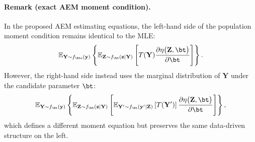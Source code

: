 \paragraph{Remark (exact AEM moment condition).}
In the proposed AEM estimating equations, the left-hand side of the population moment condition remains identical to the MLE:
\[
\mathbb{E}_{\mathbf{Y} \sim f_{\bto}(\mathbf{y})}
\left\{
\mathbb{E}_{\mathbf{Z} \sim f_\bt(\mathbf{z} \mid \mathbf{Y})}
\left[
    T(\mathbf{Y})
    \frac{\partial \eta\bigl(\mathbf{Z}, \bt\bigr)}{\partial \bt}
\right]
\right\}.
\]
However, the right-hand side instead uses the marginal distribution of $\mathbf{Y}$ under the candidate parameter $\bt$:
\[
\mathbb{E}_{\mathbf{Y} \sim f_{\bt}(\mathbf{y})}
\left\{
\mathbb{E}_{\mathbf{Z} \sim f_\bt(\mathbf{z} \mid \mathbf{Y})}
\left[
    \mathbb{E}_{\mathbf{Y}' \sim f_\bt(\mathbf{y}' \mid \mathbf{Z})}
    \left[
        T(\mathbf{Y}')
    \right]
    \frac{\partial \eta\bigl(\mathbf{Z}, \bt\bigr)}{\partial \bt}
\right]
\right\},
\]
which defines a different moment equation but preserves the same data-driven structure on the left.



